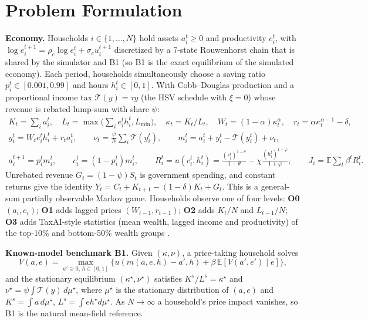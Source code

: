 \documentclass{article}
\newcommand{\E}{\mathbb{E}}
\begin{document}
\section{Problem Formulation}
\textbf{Economy.} Households $i\in\{1,\dots,N\}$ hold assets $a_i^t\ge0$ and productivity $e_i^t$, with $\log e_i^{t+1}=\rho_e\log e_i^t+\sigma_e u_i^{t+1}$ discretized by a 7-state Rouwenhorst chain \cite{kopecky2010} that is shared by the simulator and B1 (so B1 is the exact equilibrium of the simulated economy). Each period, households simultaneously choose a saving ratio $p_i^t\in[0.001,0.99]$ and hours $h_i^t\in[0,1]$. With Cobb--Douglas production and a proportional income tax $\mathcal T(y)=\tau y$ (the HSV schedule \cite{heathcote2017} with $\xi=0$) whose revenue is rebated lump-sum with share $\psi$:
\begin{gather*}
K_t=\textstyle\sum_i a_i^t,\quad L_t=\max\big(\textstyle\sum_i e_i^th_i^t,L_{\min}\big),\quad \kappa_t=K_t/L_t,\quad
W_t=(1-\alpha)\kappa_t^{\alpha},\quad r_t=\alpha\kappa_t^{\alpha-1}-\delta,\\
y_i^t=W_te_i^th_i^t+r_ta_i^t,\qquad \nu_t=\tfrac{\psi}{N}\textstyle\sum_i\mathcal T(y_i^t),\qquad m_i^t=a_i^t+y_i^t-\mathcal T(y_i^t)+\nu_t,\\
a_i^{t+1}=p_i^tm_i^t,\qquad c_i^t=(1-p_i^t)m_i^t,\qquad
R_i^t=u(c_i^t,h_i^t)=\tfrac{(c_i^t)^{1-\theta}}{1-\theta}-\chi\tfrac{(h_i^t)^{1+\varphi}}{1+\varphi},\qquad J_i=\E\textstyle\sum_t\beta^tR_i^t .
\end{gather*}
Unrebated revenue $G_t=(1-\psi)S_t$ is government spending, and constant returns give the identity $Y_t=C_t+K_{t+1}-(1-\delta)K_t+G_t$. This is a general-sum partially observable Markov game. Households observe one of four levels: \textbf{O0} $(a_i,e_i)$; \textbf{O1} adds lagged prices $(W_{t-1},r_{t-1})$; \textbf{O2} adds $K_t/N$ and $L_{t-1}/N$; \textbf{O3} adds TaxAI-style statistics (mean wealth, lagged income and productivity) of the top-10\% and bottom-50\% wealth groups \cite{mi2024taxai}.

\textbf{Known-model benchmark B1.} Given $(\kappa,\nu)$, a price-taking household solves
\begin{equation}
V(a,e)=\max_{a'\ge0,\,h\in[0,1]}\big\{u(m(a,e,h)-a',h)+\beta\,\E[V(a',e')\mid e]\big\},
\label{eq:bellman}
\end{equation}
and the stationary equilibrium $(\kappa^\star,\nu^\star)$ satisfies $K^s/L^s=\kappa^\star$ and $\nu^\star=\psi\int\mathcal T(y)\,d\mu^\star$, where $\mu^\star$ is the stationary distribution of $(a,e)$ and $K^s=\int a\,d\mu^\star$, $L^s=\int eh^\star d\mu^\star$. As $N\to\infty$ a household's price impact vanishes, so B1 is the natural mean-field reference.
\end{document}
